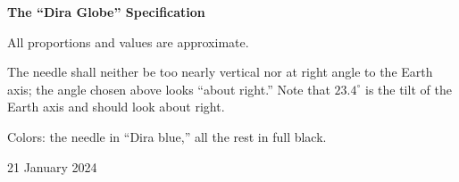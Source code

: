 \nopagenumbers
\parindent=0pt
\parskip=1pc

\topglue 2pc
\centerline{\bf The ``Dira Globe'' Specification}
\centerline{}
\leftskip=4pc
\rightskip=4pc
All proportions and values are approximate.

The needle shall neither be too nearly vertical nor
at right angle to the Earth axis; the angle chosen
above looks ``about right.''
Note that $23.4^\circ$ is the tilt of the Earth axis
and should look about right.

Colors: the needle in ``Dira blue,'' all the rest in full black.


21 January 2024

\bye
